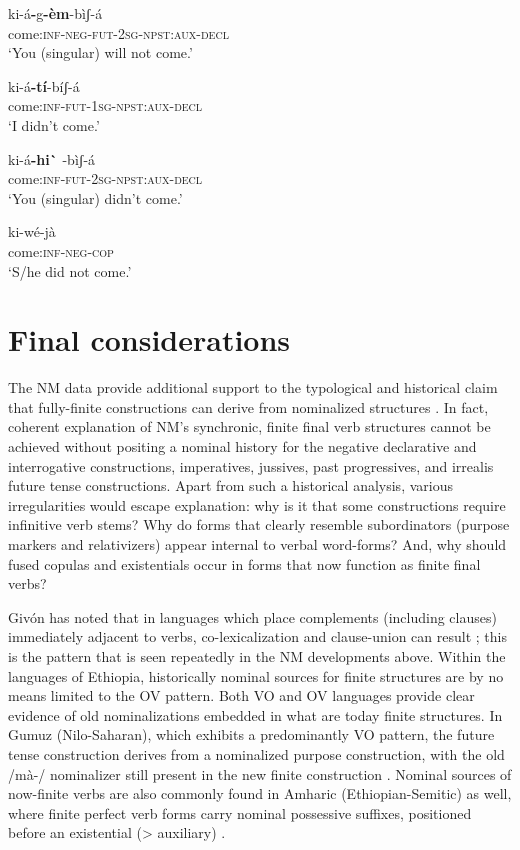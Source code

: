 \documentclass[output=paper]{langsci/langscibook}
\begin{document}
\ea\label{ex:mahland:83}
\gll ki-á\textbf{{}-}g\textbf{{}-èm}{}-bìʃ-á     \\
come:\textsc{inf-neg-fut-2sg-npst:aux-decl} \\
\glt `You (singular) will not come.'
\z

\ea\label{ex:mahland:84}
\gll ki-á\textbf{{}-}\textbf{tí}{}-bíʃ-{\downstep}á  \\
come:\textsc{inf-fut-1sg-npst:aux-decl} \\
\glt `I didn't come.'
\z

\ea\label{ex:mahland:85}
\gll ki-á\textbf{{}-hi}\textbf{\`{}} {}-bìʃ-{\downstep}á  \\
come:\textsc{inf-fut-2sg-npst:aux-decl}\\
\glt `You (singular) didn't come.'
\z

\ea\label{ex:mahland:86}
\gll ki-wé-jà\\
come:\textsc{inf-neg-cop}\\
\glt `S/he did not come.'
\z

\section{Final considerations}\label{sec:mahland:4}


The NM data provide additional support to the typological and historical claim that fully-finite constructions can derive from nominalized structures \citep{Gildea1993, Heine1993, Anderson2006, Anderson2011, DeLancey2011}. In fact, coherent explanation of NM's synchronic, finite final verb structures cannot be achieved without positing a nominal history for the negative declarative and interrogative constructions, imperatives, jussives, past progressives, and irrealis future tense constructions. Apart from such a historical analysis, various irregularities would escape explanation: why is it that some constructions require infinitive verb stems? Why do forms that clearly resemble subordinators (purpose markers and relativizers) appear internal to verbal word-forms? And, why should fused copulas and existentials occur in forms that now function as finite final verbs? 


Givón has noted that in languages which place complements (including clauses) immediately adjacent to verbs, co-lexicalization and clause-union can result \citep[74]{Givon2009}; this is the pattern that is seen repeatedly in the NM developments above. Within the languages of Ethiopia, historically nominal sources for finite structures are by no means limited to the OV pattern. Both VO and OV languages provide clear evidence of old nominalizations embedded in what are today finite structures. In Gumuz (Nilo-Saharan), which exhibits a predominantly VO pattern, the future tense construction derives from a nominalized purpose construction, with the old /mà-/ nominalizer still present in the new finite construction \citep[444]{CAhland2012}. Nominal sources of now-finite verbs are also commonly found in Amharic (Ethiopian-Semitic) as well, where finite perfect verb forms carry nominal possessive suffixes, positioned before an existential ({\textgreater} auxiliary) \citep[387]{Leslau1995}.  
\end{document}
